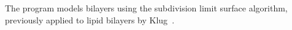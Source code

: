 
The  program models bilayers using the subdivision limit surface algorithm, previously applied to lipid bilayers by Klug~\cite{Feng2006}.

